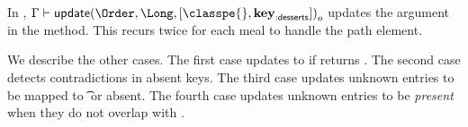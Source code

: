 In ,
$
\inpropenv{\propenv{}}{\isprop{\update{\Order}{\Long}{[{\classpe{}}, {\keype{\makekw{desserts}}}]}}{\makelocal{o}}}
$
updates the argument in the {\Long} method.
This recurs twice for each meal to handle the {\classpe{}}
path element.

We describe the other \updateliteral{} cases.
The first \classpe{} case updates
to \class{} if \classconst{} returns \Value{\class{}}.
The second \keype{\k{}} case detects contradictions in absent
keys. %
The third \keype{\k{}} case updates unknown entries to be mapped to \t{} or absent.
The fourth \keype{\k{}} case updates unknown entries to be \emph{present}
when they do not overlap with \Nil{}.

%
%
%
